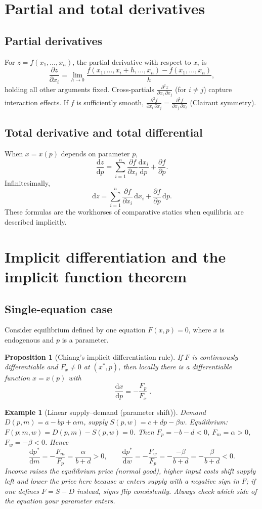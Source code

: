 \documentclass[11pt]{article}
\newcommand{\pd}[2]{\frac{\partial #1}{\partial #2}}
\newcommand{\dtotal}[2]{\frac{\mathrm{d} #1}{\mathrm{d} #2}}
\newtheorem{proposition}{Proposition}
\newtheorem{example}{Example}
\begin{document}
\section{Partial and total derivatives}

\subsection{Partial derivatives}
For \(z=f(x_1,\dots,x_n)\), the partial derivative with respect to \(x_i\) is
\[
\pd{z}{x_i}=\lim_{h\to 0}\frac{f(x_1,\dots,x_i+h,\dots,x_n)-f(x_1,\dots,x_n)}{h},
\]
holding all other arguments fixed. Cross-partials \(\pd{^2 z}{x_i\,\partial x_j}\) (for \(i\neq j\)) capture interaction effects. If \(f\) is sufficiently smooth, \(\pd{^2 f}{x_i\,\partial x_j}=\pd{^2 f}{x_j\,\partial x_i}\) (Clairaut symmetry).

\subsection{Total derivative and total differential}
When \(x=x(p)\) depends on parameter \(p\),
\[
\frac{\mathrm{d}z}{\mathrm{d}p}=\sum_{i=1}^n \pd{f}{x_i}\frac{\mathrm{d}x_i}{\mathrm{d}p}+\pd{f}{p}.
\]
Infinitesimally,
\[
\mathrm{d}z=\sum_{i=1}^n \pd{f}{x_i}\,\mathrm{d}x_i+\pd{f}{p}\,\mathrm{d}p.
\]
These formulas are the workhorses of comparative statics when equilibria are described implicitly.

\section{Implicit differentiation and the implicit function theorem}

\subsection{Single-equation case}
Consider equilibrium defined by one equation \(F(x,p)=0\), where \(x\) is endogenous and \(p\) is a parameter.

\begin{proposition}[Chiang's implicit differentiation rule]
If \(F\) is continuously differentiable and \(F_x\neq 0\) at \((x^\ast,p)\), then locally there is a differentiable function \(x=x(p)\) with
\[
\boxed{\;\dtotal{x}{p}=-\frac{F_p}{F_x}\;}.
\]
\end{proposition}

\begin{example}[Linear supply--demand (parameter shift)]
Demand \(D(p,m)=a-bp+\alpha m\), supply \(S(p,w)=c+dp-\beta w\). Equilibrium: \(F(p;m,w)=D(p,m)-S(p,w)=0\).
Then \(F_p=-b-d<0\), \(F_m=\alpha>0\), \(F_w=-\beta<0\). Hence
\[
\dtotal{p^\ast}{m}=-\frac{F_m}{F_p}=\frac{\alpha}{b+d}>0,\qquad
\dtotal{p^\ast}{w}=-\frac{F_w}{F_p}=-\frac{-\beta}{b+d}=-\frac{\beta}{b+d}<0.
\]
Income raises the equilibrium price (normal good), higher input costs shift supply left and \emph{lower} the price here because \(w\) enters supply with a negative sign in \(F\); if one defines \(F=S-D\) instead, signs flip consistently. Always check which side of the equation your parameter enters.
\end{example}
\end{document}
